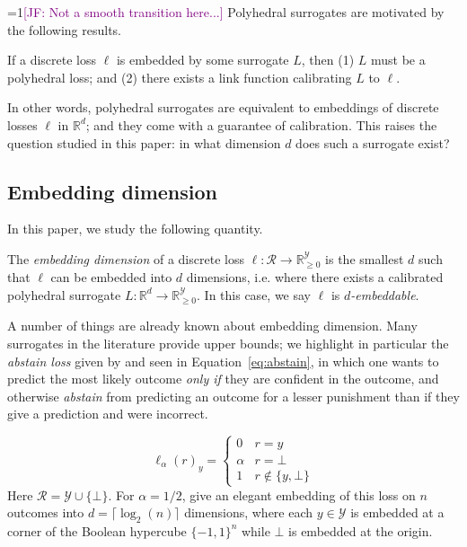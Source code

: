 \documentclass[anon]{colt2020} %
\newcommand{\Comments}{1}
\newcommand{\mynote}[2]{\ifnum\Comments=1\textcolor{#1}{#2}\fi}
\newcommand{\jessie}[1]{\mynote{purple}{[JF: #1]}}
\newcommand{\reals}{\mathbb{R}}
\newcommand{\nonnegreals}{\reals_{\geq 0}}%
\newcommand{\R}{\mathcal{R}}
\newcommand{\Y}{\mathcal{Y}}
\newcommand{\ellabs}[1]{\ell_{#1}}
\begin{document}
\jessie{Not a smooth transition here...}
Polyhedral surrogates are motivated by the following results.
\begin{theorem} \label{thm:embed-iff-poly}
  If a discrete loss $\ell$ is embedded by some surrogate $L$, then (1) $L$ must be a polyhedral loss; and (2) there exists a link function calibrating $L$ to $\ell$.
\end{theorem}
In other words, polyhedral surrogates are equivalent to embeddings of discrete losses $\ell$ in $\reals^d$; and they come with a guarantee of calibration.
This raises the question studied in this paper: in what dimension $d$ does such a surrogate exist?

\subsection{Embedding dimension}

In this paper, we study the following quantity.
\begin{definition}
  The \emph{embedding dimension} of a discrete loss $\ell: \R \to \nonnegreals^{\Y}$ is the smallest $d$ such that $\ell$ can be embedded into $d$ dimensions, i.e. where there exists a calibrated polyhedral surrogate $L: \reals^d \to \nonnegreals^{\Y}$.
  In this case, we say $\ell$ is \emph{$d$-embeddable}.
\end{definition}

A number of things are already known about embedding dimension.
Many surrogates in the literature provide upper bounds; we highlight in particular the \emph{abstain loss} given by \cite{ramaswamy2018consistent} and seen in Equation~\eqref{eq:abstain}, in which one wants to predict the most likely outcome \emph{only if} they are confident in the outcome, and otherwise \emph{abstain} from predicting an outcome for a lesser punishment than if they give a prediction and were incorrect.

\begin{equation}\label{eq:abstain}
\ellabs{\alpha}(r)_y = \begin{cases}
0 & r = y\\
\alpha & r = \bot\\
1 & r \not \in \{y, \bot\}
\end{cases}
\end{equation}
Here $\R = \Y \cup \{\bot\}$.
For $\alpha=1/2$, \cite{ramaswamy2018consistent} give an elegant embedding of this loss on $n$ outcomes into $d = \lceil \log_2 (n) \rceil$ dimensions, where each $y \in \Y$ is embedded at a corner of the Boolean hypercube $\{-1,1\}^n$ while $\bot$ is embedded at the origin.
\end{document}
